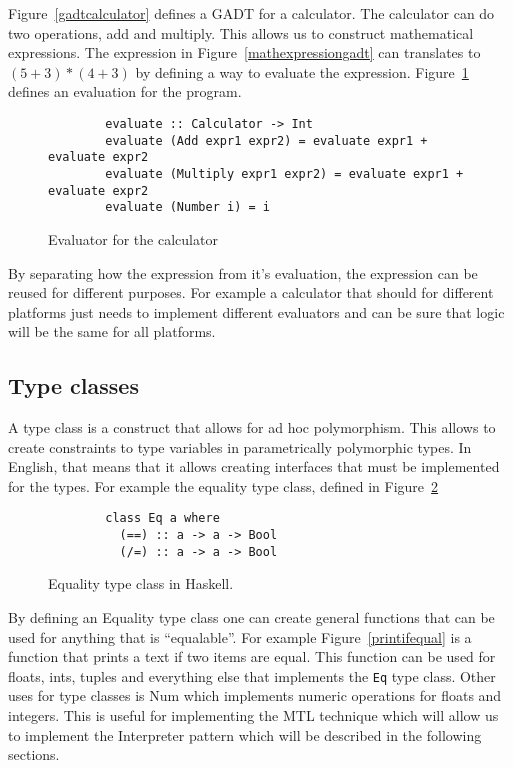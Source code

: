 Figure~\ref{gadtcalculator} defines a GADT for a calculator. The calculator can
do two operations, add and multiply. This allows us to construct mathematical
expressions. The expression in Figure~\ref{mathexpressiongadt} can translates to
$(5+3)*(4+3)$ by defining a way to evaluate the expression.
Figure~\ref{calculator} defines an evaluation for the program.

\begin{figure}[H]
    \begin{lstlisting}
        evaluate :: Calculator -> Int
        evaluate (Add expr1 expr2) = evaluate expr1 + evaluate expr2
        evaluate (Multiply expr1 expr2) = evaluate expr1 + evaluate expr2
        evaluate (Number i) = i
    \end{lstlisting}
    \caption{Evaluator for the calculator}
    \label{calculator}
\end{figure}

By separating how the expression from it's evaluation, the expression can be
reused for different purposes. For example a calculator that should for
different platforms just needs to implement different evaluators and can be sure
that logic will be the same for all platforms.

\subsection{Type classes}\label{typeclass}

A type class is a construct that allows for ad hoc polymorphism. This allows to
create constraints to type variables in parametrically polymorphic types. In
English, that means that it allows creating interfaces that must be implemented
for the types. For example the equality type class, defined in
Figure~\ref{equalitytypeclass}

\begin{figure}[H]
    \begin{lstlisting}
        class Eq a where
          (==) :: a -> a -> Bool
          (/=) :: a -> a -> Bool
    \end{lstlisting}
    \caption{Equality type class in Haskell.}
    \label{equalitytypeclass}
\end{figure}

By defining an Equality type class one can create general functions that can be
used for anything that is ``equalable''. For example Figure~\ref{printifequal}
is a function that prints a text if two items are equal. This function can be
used for floats, ints, tuples and everything else that implements the
\texttt{Eq} type class. Other uses for type classes is Num which implements
numeric operations for floats and integers. This is useful for implementing the
MTL technique which will allow us to implement the Interpreter pattern which
will be described in the following sections.

